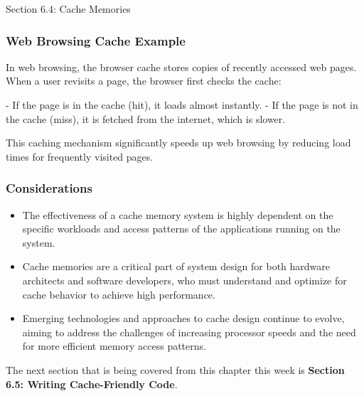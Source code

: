 \begin{notes}{Section 6.4: Cache Memories}
    \begin{highlight}
        \subsubsection*{Web Browsing Cache Example}
    
        In web browsing, the browser cache stores copies of recently accessed web pages. When a user revisits a page, the browser first checks the cache:
    
    \begin{code}
    - If the page is in the cache (hit), it loads almost instantly.
    - If the page is not in the cache (miss), it is fetched from the internet, which is slower.
    \end{code}
        This caching mechanism significantly speeds up web browsing by reducing load times for frequently visited pages.
    \end{highlight}
    
    \subsubsection*{Considerations}
    
    \begin{itemize}
        \item The effectiveness of a cache memory system is highly dependent on the specific workloads and access patterns of the applications running on the system.
        \item Cache memories are a critical part of system design for both hardware architects and software developers, who must understand and optimize for cache behavior to achieve high performance.
        \item Emerging technologies and approaches to cache design continue to evolve, aiming to address the challenges of increasing processor speeds and the need for more efficient memory access patterns.
    \end{itemize}    
\end{notes}

The next section that is being covered from this chapter this week is \textbf{Section 6.5: Writing Cache-Friendly Code}.

